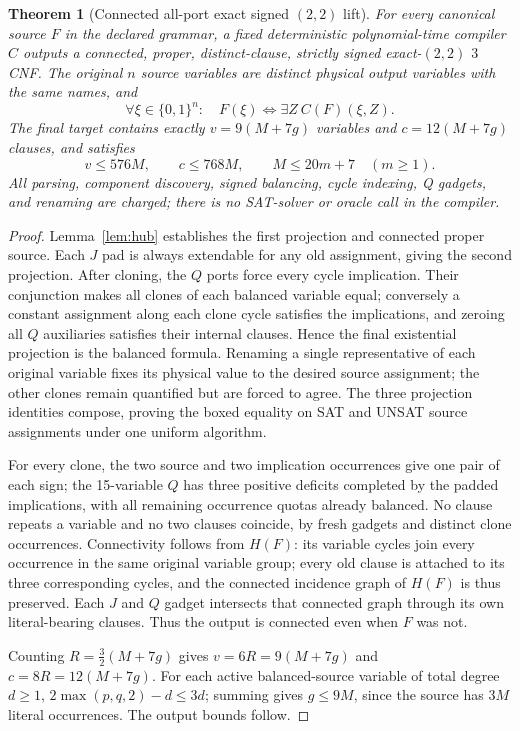 \documentclass[11pt]{article}
\newtheorem{theorem}{Theorem}
\begin{document}
\begin{theorem}[Connected all-port exact signed $(2,2)$ lift]\label{thm:allport}
For every canonical source $F$ in the declared grammar, a fixed deterministic polynomial-time compiler $C$ outputs a \emph{connected, proper, distinct-clause, strictly signed exact-$(2,2)$} $3$CNF. The original $n$ source variables are distinct physical output variables with the same names, and
\[
 \boxed{\forall\xi\in\{0,1\}^{n}:\quad
 F(\xi)\iff\exists Z\ C(F)(\xi,Z).}
\]
The final target contains exactly $v=9(M+7g)$ variables and $c=12(M+7g)$ clauses, and satisfies
\[
 v\le576M,\qquad c\le768M,\qquad
 M\le20m+7\quad(m\ge1).
\]
All parsing, component discovery, signed balancing, cycle indexing, Q gadgets, and renaming are charged; there is no SAT-solver or oracle call in the compiler.
\end{theorem}
\begin{proof}
Lemma~\ref{lem:hub} establishes the first projection and connected proper source. Each $J$ pad is always extendable for any old assignment, giving the second projection. After cloning, the $Q$ ports force every cycle implication. Their conjunction makes all clones of each balanced variable equal; conversely a constant assignment along each clone cycle satisfies the implications, and zeroing all $Q$ auxiliaries satisfies their internal clauses. Hence the final existential projection is the balanced formula. Renaming a single representative of each original variable fixes its physical value to the desired source assignment; the other clones remain quantified but are forced to agree. The three projection identities compose, proving the boxed equality on SAT and UNSAT source assignments under one uniform algorithm.

For every clone, the two source and two implication occurrences give one pair of each sign; the 15-variable $Q$ has three positive deficits completed by the padded implications, with all remaining occurrence quotas already balanced. No clause repeats a variable and no two clauses coincide, by fresh gadgets and distinct clone occurrences. Connectivity follows from $H(F)$: its variable cycles join every occurrence in the same original variable group; every old clause is attached to its three corresponding cycles, and the connected incidence graph of $H(F)$ is thus preserved. Each $J$ and $Q$ gadget intersects that connected graph through its own literal-bearing clauses. Thus the output is connected even when $F$ was not.

Counting $R=\frac32(M+7g)$ gives $v=6R=9(M+7g)$ and $c=8R=12(M+7g)$. For each active balanced-source variable of total degree $d\ge1$, $2\max(p,q,2)-d\le3d$; summing gives $g\le9M$, since the source has $3M$ literal occurrences. The output bounds follow.\end{proof}
\end{document}
